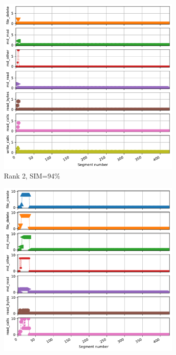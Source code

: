 \documentclass{jhps}
\begin{document}
\begin{figure}[bt]
\begin{subfigure}{0.3\textwidth}
\centering
\includegraphics[width=\textwidth]{job_similarities_7488914-out/hex_native-0.9390--1timeseries7266845}
\caption{Rank 2, SIM=94\%}
\end{subfigure}
\begin{subfigure}{0.3\textwidth}
\centering
\includegraphics[width=\textwidth]{job_similarities_7488914-out/hex_native-0.9333--2timeseries7214657}

\end{subfigure}
\end{figure}
\end{document}
